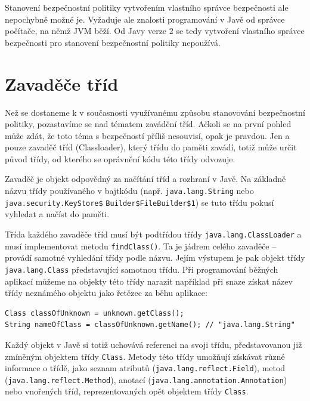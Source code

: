 Stanovení bezpečnostní politiky vytvořením vlastního správce bezpečnosti ale nepochybně možné je. Vyžaduje ale znalosti programování v Javě od správce počítače, na němž JVM běží. Od Javy verze 2 se tedy vytvoření vlastního správce bezpečnosti pro stanovení bezpečnostní politiky nepoužívá.

\section{Zavaděče tříd} \label{classloader}

Než se dostaneme k v současnosti využívanému způsobu stanovování bezpečnostní politiky, pozastavíme se nad tématem zavádění tříd.
Ačkoli se na první pohled může zdát, že toto téma s bezpečností příliš nesouvisí, opak je pravdou.
Jen a pouze zavaděč tříd (Classloader), který třídu do paměti zavádí, totiž může určit původ třídy, od kterého se oprávnění kódu této třídy odvozuje.

Zavaděč je objekt odpovědný za načítání tříd a rozhraní v Javě. Na základně názvu třídy používaného v bajtkódu (např. {\tt java.lang.String} nebo {\tt java.security.KeyStore\$} {\tt Builder\$FileBuilder\$1}) se tuto třídu pokusí vyhledat a načíst do paměti. \cite{refClassLoader}

Třída každého zavaděče tříd musí být podtřídou třídy {\tt java.lang.ClassLoader} a musí implementovat metodu {\tt findClass()}. Ta je jádrem celého zavaděče -- provádí samotné vyhledání třídy podle názvu. Jejím výstupem je pak objekt třídy {\tt java.lang.Class} představující samotnou třídu. Při programování běžných aplikací můžeme na objekty této třídy narazit například při snaze získat název třídy neznámého objektu jako řetězec za běhu aplikace: \cite{refClassLoader}

\begin{lstlisting}[caption=Získávání názvu třídy neznámého objektu, label=getClassName]
Class classOfUnknown = unknown.getClass();
String nameOfClass = classOfUnknown.getName(); // "java.lang.String"
\end{lstlisting}

Každý objekt v Javě si totiž uchovává referenci na svoji třídu, představovanou již zmíněným objektem třídy {\tt Class}. Metody této třídy umožňují získávat různé informace o třídě, jako seznam atributů ({\tt java.lang.reflect.Field}), metod ({\tt java.lang.reflect.Method}), anotací ({\tt java.lang.annotation.Annotation}) nebo vnořených tříd, reprezentovaných opět objektem třídy {\tt Class}.

